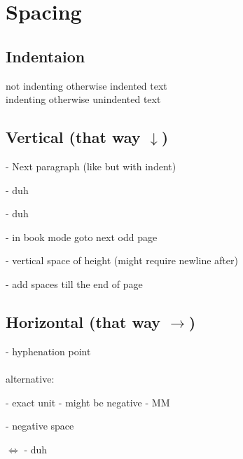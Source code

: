 \section{Spacing}
\subsection{Indentaion}
\begin{example}
\noindent not indenting otherwise indented text\\
\indent indenting otherwise unindented text
\end{example}
\subsection[Vertical]{Vertical (that way $\downarrow$)}
\indent

\code{\par} - Next paragraph (like  \code{\\} but with indent)

\code{\newpage \pagebreak \clearpage} - duh

\code{\smallskip \medskip \bigskip } - duh

\code{\cleardoublepage} - in book mode goto next odd page

\code{\\[10cm] \vspace{10pt}} - vertical space of height (might require newline after)

\code{\vfill} - add spaces till the end of page


\subsection[Horizontal]{Horizontal (that way $\rightarrow$)}
\indent

\code{\-} - hyphenation point\\
\\
alternative: 
\smallskip

\code{\hspace{10pt}} - exact unit - might be negative
 - M\hspace{-9pt}M

\code{\!} - negative space

\code{\thinspace \medspace \thickspace} $\iff$ \code{\, \: \;} - duh

